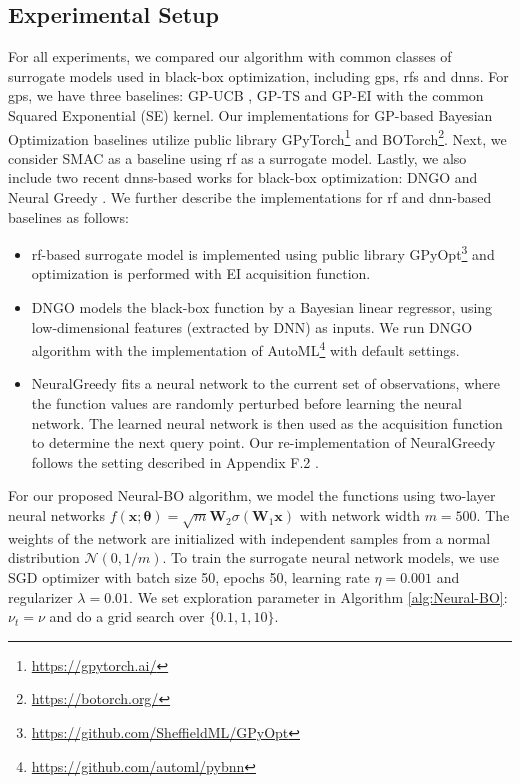 \subsection{Experimental Setup}
For all experiments, we compared our algorithm with common classes of surrogate models used in black-box optimization, including \acp{gp}, \acp{rf} and \acp{dnn}. For \acp{gp}, we have three baselines: GP-UCB \citep{srinivas2009gaussian}, GP-TS \citep{chowdhury2017kernelized} and GP-EI \citep{jones1998efficient} with the common Squared Exponential (SE) kernel. Our implementations for GP-based Bayesian Optimization baselines utilize public library GPyTorch\footnote{\url{https://gpytorch.ai/}} and BOTorch\footnote{\url{https://botorch.org/}}. Next, we consider SMAC \citep{hutter2011sequential} as a baseline using \ac{rf} as a surrogate model. Lastly, we also include two recent \acp{dnn}-based works for black-box optimization: DNGO \citep{snoek2015scalable} and Neural Greedy \citep{pariagreedy}. We further describe the implementations for \ac{rf} and \ac{dnn}-based baselines as follows: 
\begin{itemize}
    \item \ac{rf}-based surrogate model is implemented using public library GPyOpt\footnote{\url{https://github.com/SheffieldML/GPyOpt}} and optimization is performed with EI acquisition function.
    \item DNGO \citep{snoek2015scalable} models the black-box function by a Bayesian linear regressor, using low-dimensional features (extracted by DNN) as inputs. We run DNGO algorithm with the implementation of AutoML\footnote{\url{https://github.com/automl/pybnn}} with default settings. 
    \item NeuralGreedy \citep{pariagreedy} fits a neural network to the current set of observations, where the function values are randomly perturbed before learning the neural network. The learned neural network is then used as the acquisition function to determine the next query point. Our re-implementation of NeuralGreedy follows the setting described in Appendix F.2 \citep{pariagreedy}.  
\end{itemize}
 

For our proposed Neural-BO algorithm, we model the functions using two-layer neural networks $f(\mathbf{x}; \boldsymbol{\theta}) = \sqrt{m}\mathbf{W}_2\sigma(\mathbf{W}_1\mathbf{x})$ with network width $m=500$. 
The weights of the network are initialized with independent samples from a normal distribution $\mathcal{N} (0, 1/m)$. To train the surrogate neural network models, we use SGD optimizer with batch size 50, epochs 50, learning rate $\eta=0.001$ and regularizer $\lambda=0.01$. We set exploration parameter in Algorithm \ref{alg:Neural-BO}: $\nu_t = \nu$ and do a grid search over $\{0.1,1,10\}$. 

